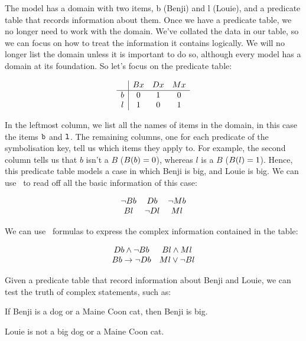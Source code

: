 \documentclass[PHIL101-Textbook.tex]{subfiles}
\begin{document}
\noindent The model has a domain with two items, \dom b (Benji) and \dom l (Louie), and a predicate table that records information about them. Once we have a predicate table, we no longer need to work with the domain. We've collated the data in our table, so we can focus on how to treat the information it contains logically. We will no longer list the domain unless it is important to do so, although every model has a domain at its foundation. So let's focus on the predicate table:  

\[\begin{array}{c|ccc}
	  &\mathord{B}{x}& \mathord{D}{x}& \mathord{M}{x}\\ \hline
	  b & 0 & 1 & 0\\
	  l & 1 & 0 & 1
	\end{array}\]

\noindent In the leftmost column, we list all the names of items in the domain, in this case the items $\mathtt{b}$ and $\mathtt{l}$. The remaining columns, one for each predicate of the symbolisation key, tell us which items they apply to. For example, the second column tells us that $b$ isn't a $B$ ($B(b) = 0$), whereas $l$ is a $B$ ($B(l) = 1$). Hence, this predicate table models a case in which Benji is big, and Louie is big. We can use \pl\ to read off all the basic information of this case: 

\[\begin{array}{ccc}
	\neg \mathord{B}{b}& \mathord{D}{b}& \neg \mathord{M}{b}\\
	\mathord{B}{l} & \neg \mathord{D}{l} & \mathord{M}{l}
\end{array}\]


\noindent We can use \pl\ formulas to express the complex information contained in the table:

\[\begin{array}{cc}
	\mathord{D}{b} \land \mathord{\neg}{B} b & \mathord{B}{l} \land M l\\
	\mathord{B}{b} \rightarrow  \neg \mathord{D}{b} & \mathord{M}{l} \vee \neg \mathord{B}{l}
\end{array}\]

\noindent Given a predicate table that record information about Benji and Louie, we can test the truth of complex statements, such as:

\begin{earg}
\item[\ex{Benji}]If Benji is a dog or a Maine Coon cat, then Benji is big.
\item[\ex{Louie}]Louie is not a big dog or a Maine Coon cat.
\end{earg}
\end{document}
